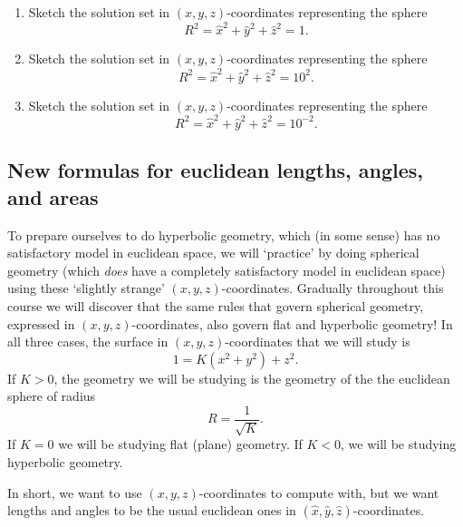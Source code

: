 \documentclass[newpage,hints,handout,12pt,noauthor,nooutcomes]{ximera}
\begin{document}
\begin{problem}\hfil
\begin{enumerate}
\item Sketch the solution set in $\left(  x,y,z\right)  $-coordinates
representing the sphere%
\[
R^{2}=\hat{x}^{2}+\hat{y}^{2}+\hat{z}^{2}=1.
\]

\item Sketch the solution set in $\left(  x,y,z\right)  $-coordinates
representing the sphere%
\[
R^{2}=\hat{x}^{2}+\hat{y}^{2}+\hat{z}^{2}=10^{2}.
\]

\item Sketch the solution set in $\left(  x,y,z\right)  $-coordinates
representing the sphere%
\[
R^{2}=\hat{x}^{2}+\hat{y}^{2}+\hat{z}^{2}=10^{-2}.
\]
\end{enumerate}
%
\end{problem}

\subsection{New formulas for euclidean lengths, angles, and areas}

To prepare ourselves to do hyperbolic geometry, which (in some sense)
has no satisfactory model in euclidean space, we will `practice' by
doing spherical geometry (which \textit{does} have a completely
satisfactory model in euclidean space) using these `slightly strange'
$(x,y,z)$-coordinates. Gradually throughout this course
we will discover that the same rules that govern spherical geometry,
expressed in $(x,y,z)$-coordinates, also govern flat and
hyperbolic geometry! In all three cases, the surface in $\left(
x,y,z\right) $-coordinates that we will study is%
\[
1=K\left(x^{2}+y^{2}\right)+z^{2} .
\]
If $K>0$, the geometry we will be studying is the geometry of the the
euclidean sphere of radius%
\[
R=\frac{1}{\sqrt{K}}.
\]
If $K=0$ we will be studying flat (plane) geometry. If $K<0$, we will be
studying hyperbolic geometry. 

In short, we want to use $(  x,y,z)  $-coordinates to compute with,
but we want lengths and angles to be the usual euclidean ones in $(
\hat{x},\hat{y},\hat{z})  $-coordinates.
\end{document}
